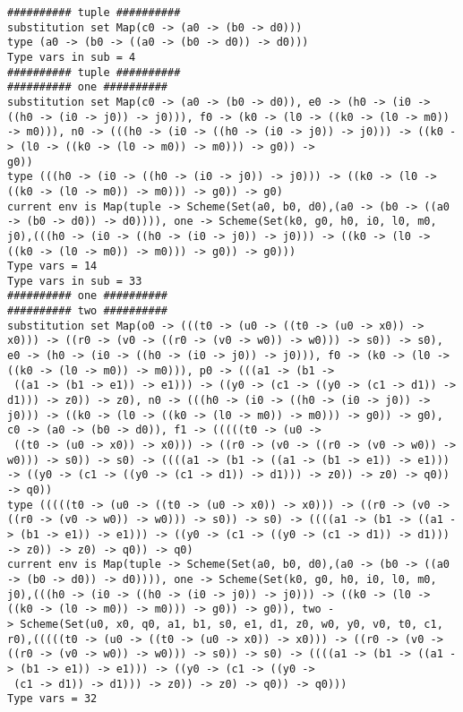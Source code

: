 \documentclass[11pt,oneside,a4paper]{report}
\begin{document}
\begin{lstlisting}[breaklines=true,caption={The output of an exponential type},label=lst:appedix:bigexp]
########## tuple ##########
substitution set Map(c0 -> (a0 -> (b0 -> d0)))
type (a0 -> (b0 -> ((a0 -> (b0 -> d0)) -> d0)))
Type vars in sub = 4
########## tuple ##########
########## one ##########
substitution set Map(c0 -> (a0 -> (b0 -> d0)), e0 -> (h0 -> (i0 -> ((h0 -> (i0 -> j0)) -> j0))), f0 -> (k0 -> (l0 -> ((k0 -> (l0 -> m0)) -> m0))), n0 -> (((h0 -> (i0 -> ((h0 -> (i0 -> j0)) -> j0))) -> ((k0 -> (l0 -> ((k0 -> (l0 -> m0)) -> m0))) -> g0)) ->
g0))
type (((h0 -> (i0 -> ((h0 -> (i0 -> j0)) -> j0))) -> ((k0 -> (l0 -> ((k0 -> (l0 -> m0)) -> m0))) -> g0)) -> g0)
current env is Map(tuple -> Scheme(Set(a0, b0, d0),(a0 -> (b0 -> ((a0 -> (b0 -> d0)) -> d0)))), one -> Scheme(Set(k0, g0, h0, i0, l0, m0, j0),(((h0 -> (i0 -> ((h0 -> (i0 -> j0)) -> j0))) -> ((k0 -> (l0 -> ((k0 -> (l0 -> m0)) -> m0))) -> g0)) -> g0)))
Type vars = 14
Type vars in sub = 33
########## one ##########
########## two ##########
substitution set Map(o0 -> (((t0 -> (u0 -> ((t0 -> (u0 -> x0)) -> x0))) -> ((r0 -> (v0 -> ((r0 -> (v0 -> w0)) -> w0))) -> s0)) -> s0), e0 -> (h0 -> (i0 -> ((h0 -> (i0 -> j0)) -> j0))), f0 -> (k0 -> (l0 -> ((k0 -> (l0 -> m0)) -> m0))), p0 -> (((a1 -> (b1 ->
 ((a1 -> (b1 -> e1)) -> e1))) -> ((y0 -> (c1 -> ((y0 -> (c1 -> d1)) -> d1))) -> z0)) -> z0), n0 -> (((h0 -> (i0 -> ((h0 -> (i0 -> j0)) -> j0))) -> ((k0 -> (l0 -> ((k0 -> (l0 -> m0)) -> m0))) -> g0)) -> g0), c0 -> (a0 -> (b0 -> d0)), f1 -> (((((t0 -> (u0 ->
 ((t0 -> (u0 -> x0)) -> x0))) -> ((r0 -> (v0 -> ((r0 -> (v0 -> w0)) -> w0))) -> s0)) -> s0) -> ((((a1 -> (b1 -> ((a1 -> (b1 -> e1)) -> e1))) -> ((y0 -> (c1 -> ((y0 -> (c1 -> d1)) -> d1))) -> z0)) -> z0) -> q0)) -> q0))
type (((((t0 -> (u0 -> ((t0 -> (u0 -> x0)) -> x0))) -> ((r0 -> (v0 -> ((r0 -> (v0 -> w0)) -> w0))) -> s0)) -> s0) -> ((((a1 -> (b1 -> ((a1 -> (b1 -> e1)) -> e1))) -> ((y0 -> (c1 -> ((y0 -> (c1 -> d1)) -> d1))) -> z0)) -> z0) -> q0)) -> q0)
current env is Map(tuple -> Scheme(Set(a0, b0, d0),(a0 -> (b0 -> ((a0 -> (b0 -> d0)) -> d0)))), one -> Scheme(Set(k0, g0, h0, i0, l0, m0, j0),(((h0 -> (i0 -> ((h0 -> (i0 -> j0)) -> j0))) -> ((k0 -> (l0 -> ((k0 -> (l0 -> m0)) -> m0))) -> g0)) -> g0)), two -
> Scheme(Set(u0, x0, q0, a1, b1, s0, e1, d1, z0, w0, y0, v0, t0, c1, r0),(((((t0 -> (u0 -> ((t0 -> (u0 -> x0)) -> x0))) -> ((r0 -> (v0 -> ((r0 -> (v0 -> w0)) -> w0))) -> s0)) -> s0) -> ((((a1 -> (b1 -> ((a1 -> (b1 -> e1)) -> e1))) -> ((y0 -> (c1 -> ((y0 ->
 (c1 -> d1)) -> d1))) -> z0)) -> z0) -> q0)) -> q0)))
Type vars = 32

\end{lstlisting}
\end{document}
